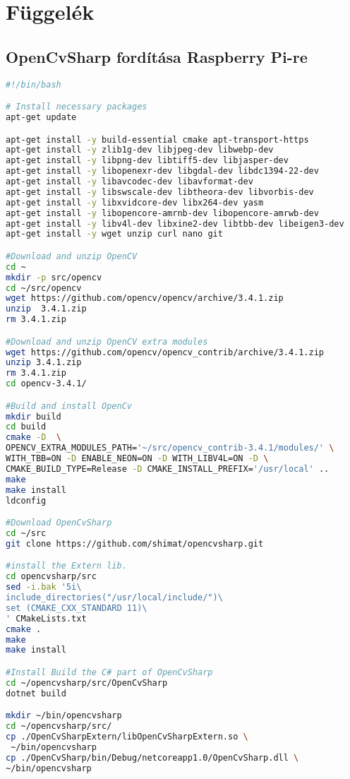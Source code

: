 \appendix

\chapter*{Függelék}

\setcounter{chapter}{6}     %

\section{OpenCvSharp fordítása Raspberry Pi-re} \label{rpi-build-script}
\begin{mdframed}[backgroundcolor=gray!20]
\begin{scriptsize}
\begin{lstlisting}[language=bash]
#!/bin/bash

# Install necessary packages
apt-get update

apt-get install -y build-essential cmake apt-transport-https
apt-get install -y zlib1g-dev libjpeg-dev libwebp-dev 
apt-get install -y libpng-dev libtiff5-dev libjasper-dev  
apt-get install -y libopenexr-dev libgdal-dev libdc1394-22-dev
apt-get install -y libavcodec-dev libavformat-dev
apt-get install -y libswscale-dev libtheora-dev libvorbis-dev 
apt-get install -y libxvidcore-dev libx264-dev yasm
apt-get install -y libopencore-amrnb-dev libopencore-amrwb-dev
apt-get install -y libv4l-dev libxine2-dev libtbb-dev libeigen3-dev
apt-get install -y wget unzip curl nano git

#Download and unzip OpenCV
cd ~
mkdir -p src/opencv
cd ~/src/opencv
wget https://github.com/opencv/opencv/archive/3.4.1.zip
unzip  3.4.1.zip
rm 3.4.1.zip

#Download and unzip OpenCV extra modules
wget https://github.com/opencv/opencv_contrib/archive/3.4.1.zip
unzip 3.4.1.zip
rm 3.4.1.zip
cd opencv-3.4.1/

#Build and install OpenCv
mkdir build
cd build
cmake -D  \
OPENCV_EXTRA_MODULES_PATH='~/src/opencv_contrib-3.4.1/modules/' \
WITH_TBB=ON -D ENABLE_NEON=ON -D WITH_LIBV4L=ON -D \
CMAKE_BUILD_TYPE=Release -D CMAKE_INSTALL_PREFIX='/usr/local' ..
make
make install
ldconfig

#Download OpenCvSharp
cd ~/src
git clone https://github.com/shimat/opencvsharp.git

#install the Extern lib.
cd opencvsharp/src
sed -i.bak '5i\
include_directories("/usr/local/include/")\
set (CMAKE_CXX_STANDARD 11)\
' CMakeLists.txt
cmake .
make
make install

#Install Build the C# part of OpenCvSharp
cd ~/opencvsharp/src/OpenCvSharp
dotnet build

mkdir ~/bin/opencvsharp
cd ~/opencvsharp/src/
cp ./OpenCvSharpExtern/libOpenCvSharpExtern.so \
 ~/bin/opencvsharp
cp ./OpenCvSharp/bin/Debug/netcoreapp1.0/OpenCvSharp.dll \
~/bin/opencvsharp
\end{lstlisting}
\end{scriptsize}
\end{mdframed}

